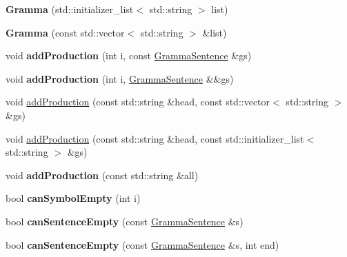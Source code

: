 \begin{DoxyCompactItemize}
\item 
\mbox{\label{classx2_1_1_gramma_af5e2d1e16f16be36dab8d5caed577bb3}} 
{\bfseries Gramma} (std\+::initializer\+\_\+list$<$ std\+::string $>$ list)
\item 
\mbox{\label{classx2_1_1_gramma_a32aff8f7801e9247ad2b9e54343c06aa}} 
{\bfseries Gramma} (const std\+::vector$<$ std\+::string $>$ \&list)
\item 
\mbox{\label{classx2_1_1_gramma_ae2f19aee6d2718fafb04cad678519e4a}} 
void {\bfseries add\+Production} (int i, const \hyperlink{classx2_1_1_gramma_sentence}{Gramma\+Sentence} \&gs)
\item 
\mbox{\label{classx2_1_1_gramma_ace0d616133f9cd0b8ed81d7e98963f34}} 
void {\bfseries add\+Production} (int i, \hyperlink{classx2_1_1_gramma_sentence}{Gramma\+Sentence} \&\&gs)
\item 
void \hyperlink{classx2_1_1_gramma_aaf4cbec7886ba7eaf878ca75a517e4e0}{add\+Production} (const std\+::string \&head, const std\+::vector$<$ std\+::string $>$ \&gs)
\item 
void \hyperlink{classx2_1_1_gramma_a86ff823a6b5aefacbc9a024414c078d8}{add\+Production} (const std\+::string \&head, const std\+::initializer\+\_\+list$<$ std\+::string $>$ \&gs)
\item 
\mbox{\label{classx2_1_1_gramma_ab1701d83a618434e4025b42d59c3ed05}} 
void {\bfseries add\+Production} (const std\+::string \&all)
\item 
\mbox{\label{classx2_1_1_gramma_a10072e9945425e348fe164ae11dbd48e}} 
bool {\bfseries can\+Symbol\+Empty} (int i)
\item 
\mbox{\label{classx2_1_1_gramma_a3ba8caf8e40ce5ce3e02fadd7fed0309}} 
bool {\bfseries can\+Sentence\+Empty} (const \hyperlink{classx2_1_1_gramma_sentence}{Gramma\+Sentence} \&s)
\item 
\mbox{\label{classx2_1_1_gramma_ade7340fc0ee5e8514314465d5cae3348}} 
bool {\bfseries can\+Sentence\+Empty} (const \hyperlink{classx2_1_1_gramma_sentence}{Gramma\+Sentence} \&s, int end)
\item 

\end{DoxyCompactItemize}
